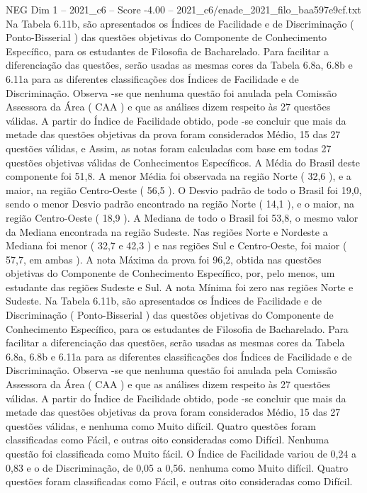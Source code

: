 \begin{textsample}{NEG Dim 1 – 2021\_c6 – Score -4.00 – 2021\_c6/enade\_2021\_filo\_baa597e9cf.txt}
Na Tabela 6.11b, são apresentados os Índices de Facilidade e de Discriminação ( Ponto-Bisserial ) das questões objetivas do Componente de Conhecimento Específico, para os estudantes de Filosofia de Bacharelado.
Para facilitar a diferenciação das questões, serão usadas as mesmas cores da Tabela 6.8a, 6.8b e 6.11a para as diferentes classificações dos Índices de Facilidade e de Discriminação.
Observa -se que nenhuma questão foi anulada pela Comissão Assessora da Área ( CAA ) e que as análises dizem respeito às 27 questões válidas.
A partir do Índice de Facilidade obtido, pode -se concluir que mais da metade das questões objetivas da prova foram considerados Médio, 15 das 27 questões válidas, e Assim, as notas foram calculadas com base em todas 27 questões objetivas válidas de Conhecimentos Específicos.
A Média do Brasil deste componente foi 51,8.
A menor Média foi observada na região Norte ( 32,6 ), e a maior, na região Centro-Oeste ( 56,5 ).
O Desvio padrão de todo o Brasil foi 19,0, sendo o menor Desvio padrão encontrado na região Norte ( 14,1 ), e o maior, na região Centro-Oeste ( 18,9 ).
A Mediana de todo o Brasil foi 53,8, o mesmo valor da Mediana encontrada na região Sudeste.
Nas regiões Norte e Nordeste a Mediana foi menor ( 32,7 e 42,3 ) e nas regiões Sul e Centro-Oeste, foi maior ( 57,7, em ambas ).
A nota Máxima da prova foi 96,2, obtida nas questões objetivas do Componente de Conhecimento Específico, por, pelo menos, um estudante das regiões Sudeste e Sul.
A nota Mínima foi zero nas regiões Norte e Sudeste.
Na Tabela 6.11b, são apresentados os Índices de Facilidade e de Discriminação ( Ponto-Bisserial ) das questões objetivas do Componente de Conhecimento Específico, para os estudantes de Filosofia de Bacharelado.
Para facilitar a diferenciação das questões, serão usadas as mesmas cores da Tabela 6.8a, 6.8b e 6.11a para as diferentes classificações dos Índices de Facilidade e de Discriminação.
Observa -se que nenhuma questão foi anulada pela Comissão Assessora da Área ( CAA ) e que as análises dizem respeito às 27 questões válidas.
A partir do Índice de Facilidade obtido, pode -se concluir que mais da metade das questões objetivas da prova foram considerados Médio, 15 das 27 questões válidas, e nenhuma como Muito difícil.
Quatro questões foram classificadas como Fácil, e outras oito consideradas como Difícil.
Nenhuma questão foi classificada como Muito fácil.
O Índice de Facilidade variou de 0,24 a 0,83 e o de Discriminação, de 0,05 a 0,56. nenhuma como Muito difícil.
Quatro questões foram classificadas como Fácil, e outras oito consideradas como Difícil.

\end{textsample}
